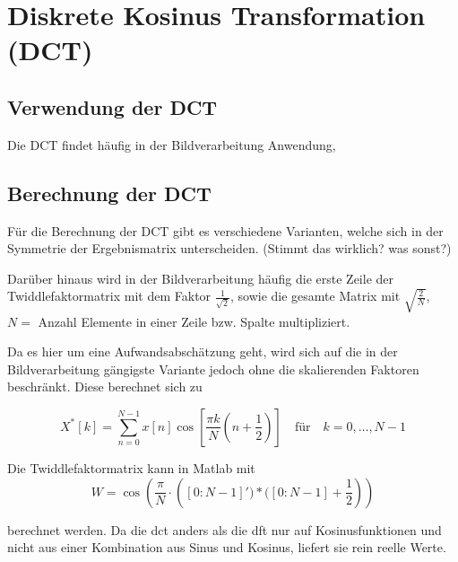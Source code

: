 \section{Diskrete Kosinus Transformation (DCT)}
\subsection{Verwendung der DCT}
Die DCT findet häufig in der Bildverarbeitung Anwendung, 

\subsection{Berechnung der DCT}
Für die Berechnung der DCT gibt es verschiedene Varianten, welche sich in der Symmetrie der Ergebnismatrix unterscheiden. (Stimmt das wirklich? was sonst?)

Darüber hinaus wird in der Bildverarbeitung häufig die erste Zeile der Twiddlefaktormatrix mit dem Faktor $\frac{1}{\sqrt2}$, sowie die gesamte Matrix mit 
$\sqrt{\frac{2}{N}}$, $N =$ Anzahl Elemente in einer Zeile bzw. Spalte multipliziert.

Da es hier um eine Aufwandsabschätzung geht, wird sich auf die in der Bildverarbeitung gängigste Variante jedoch ohne die skalierenden Faktoren beschränkt.
Diese berechnet sich zu

\begin{equation}
X^*[k] = \sum_{n=0}^{N-1} x[n] \cos\left[\frac{\pi k}{N} \left(n+\frac{1}{2}\right) \right] \quad \textrm{für} \quad  k=0,\dots,N-1
\end{equation}

Die Twiddlefaktormatrix kann in Matlab mit
 \begin{equation}\label{eq:matlab_dct_faktoren}
  W = \cos\left(\frac{\pi}{N}\cdot \left([0:N-1]')*([0:N-1]+\frac{1}{2}\right)\right)
 \end{equation}

berechnet werden. Da die \gls{dct} anders als die \gls{dft} nur auf Kosinusfunktionen und nicht aus einer Kombination aus Sinus und Kosinus, liefert sie rein
reelle Werte.